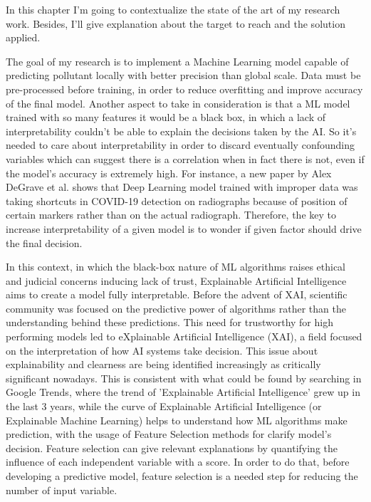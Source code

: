 In this chapter I'm going to contextualize the state of the art of my research work. 
Besides, I'll give explanation about the target to reach and the solution applied.\par
The goal of my research is to implement a Machine Learning model capable of predicting pollutant locally with better precision than global scale. 
Data must be pre-processed before training, in order to reduce overfitting and improve accuracy of the final model.\newline
Another aspect to take in consideration is that a ML model trained with so many features it would be a black box, in which a lack of interpretability couldn't be able to explain the decisions taken by the AI.
So it's needed to care about interpretability in order to discard eventually confounding variables  which can suggest there is a correlation when in fact there is not, even if the model's accuracy is extremely high. \newline
For instance, a new paper by Alex DeGrave et al.\cite{degrave2021ai} shows that Deep Learning model trained with improper data was taking shortcuts in COVID-19 detection on radiographs because of position of certain markers rather than on the actual radiograph.
Therefore, the key to increase interpretability of a given model is to wonder if given factor should drive the final decision.\par
In this context, in which the black-box nature of ML algorithms raises ethical and judicial concerns inducing lack of trust\cite{9141213}, Explainable Artificial Intelligence aims to create a model fully interpretable.
Before the advent of XAI, scientific community was focused on the predictive power of algorithms rather than the understanding behind these predictions.
This need for trustworthy for high performing models led to  eXplainable Artificial Intelligence (XAI), a field focused on the interpretation of how AI systems take decision.
This issue about explainability and clearness are being identified increasingly as critically significant nowadays. 
This is consistent with what could be found by searching in Google Trends, where the trend of 'Explainable Artificial Intelligence' grew up in the last 3 years, while the curve of
Explainable Artificial Intelligence (or Explainable Machine Learning) helps to understand how ML algorithms make prediction, with the usage of Feature Selection methods for clarify model’s decision.
Feature selection can give relevant explanations by quantifying the influence of each independent variable with a score.
In order to do that, before developing a predictive model, feature selection is a needed step for reducing the number of input variable. \newline
